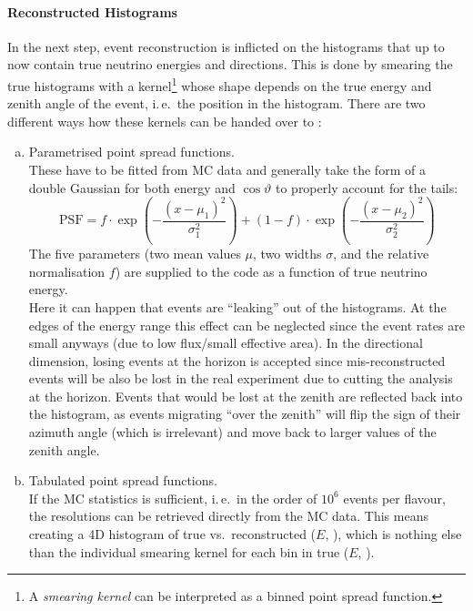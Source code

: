 \paragraph{Reconstructed Histograms}

In the next step, event reconstruction is inflicted on the histograms that up
to now contain true neutrino energies and directions. This is done by smearing
the true histograms with a kernel\footnote{A \emph{smearing kernel} can be
interpreted as a binned point spread function.} whose shape depends on the true
energy and zenith angle of the event, i.\,e.\ the position in the histogram.
There are two different ways how these kernels can be handed over to \papa:

\begin{enumerate}[(a)]
 \item Parametrised point spread functions.\\ These have to be fitted from MC
  data and generally take the form of a double Gaussian for both energy and
  $\cos\vartheta$ to properly account for the tails:
  \begin{equation}
   \mathrm{PSF} = f\cdot \exp\left(-\frac{(x-\mu_1)^2}{\sigma_1^2}\right)
                  + (1-f)\cdot \exp\left(-\frac{(x-\mu_2)^2}{\sigma_2^2}\right)
   \label{eqn:reco_param}
  \end{equation}
  The five parameters (two mean values $\mu$, two widths $\sigma$, and the
  relative normalisation $f$) are supplied to the code as a function of true
  neutrino energy.\\
  Here it can happen that events are ``leaking'' out of the histograms. At
  the edges of the energy range this effect can be neglected since the event
  rates are small anyways (due to low flux/small effective area). In the
  directional dimension, losing events at the horizon is accepted since
  mis-reconstructed events will be also be lost in the real experiment due to
  cutting the analysis at the horizon. Events that would be lost at the zenith
  are reflected back into the histogram, as events migrating ``over the
  zenith'' will flip the sign of their azimuth angle (which is irrelevant) and
  move back to larger values of the zenith angle.
 \item Tabulated point spread functions.\\ If the MC statistics is sufficient,
  i.\,e.\ in the order of $10^6$ events per flavour, the resolutions can be
  retrieved directly from the MC data. This means creating a 4D histogram of
  true vs.\ reconstructed ($E$, \coszen), which is nothing else than
  the individual smearing kernel for each bin in true ($E$, \coszen).
  \end{enumerate}
